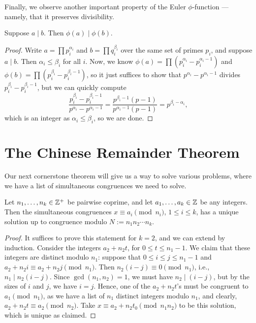 \documentclass{article}
\begin{document}
Finally, we observe another important property of the Euler $\phi$-function --- namely, that it preserves divisibility. \newpage
\begin{proposition}
Suppose $a\mid b$. Then $\phi(a)\mid \phi(b)$.
\end{proposition}
\begin{proof}
Write $a = \prod p_i^{\alpha_i}$ and $b = \prod q_i^{\beta_i}$ over the same set of primes $p_i$, and suppose $a\mid b$. Then $\alpha_i \leq \beta_i$ for all $i$. Now, we know $\phi(a) = \prod (p_i^{\alpha_i} - p_i^{\alpha_i-1})$ and $\phi(b) = \prod (p_i^{\beta_i} - p_i^{\beta_i-1})$, so it just suffices to show that $p^{\alpha_i}-p^{\alpha_i-1}$ divides $p_i^{\beta_i} - p_i^{\beta_i-1}$, but we can quickly compute
$$\frac{p_i^{\beta_i} - p_i^{\beta_i-1}}{p^{\alpha_i}-p^{\alpha_i-1}} = \frac{p^{\beta_i-1}(p-1)}{p^{\alpha_i-1}(p-1)} = p^{\beta_i - \alpha_i},$$
which is an integer as $\alpha_i\leq \beta_i$, so we are done.
\end{proof}

\section{The Chinese Remainder Theorem}
Our next cornerstone theorem will give us a way to solve various problems, where we have a list of simultaneous congruences we need to solve.

\begin{theorem}
Let $n_1, \ldots, n_k \in \mathbb Z^+$ be pairwise coprime, and let $a_1, \ldots, a_k\in\mathbb Z$ be any integers. Then the simultaneous congruences $x \equiv a_i\pmod{n_i}$, $1\leq i \leq k$, has a unique solution up to congruence modulo $N := n_1n_2\cdots n_k$.
\end{theorem}
\begin{proof}
It suffices to prove this statement for $k = 2$, and we can extend by induction. Consider the integers $a_2 + n_2t$, for $0\leq t \leq n_1-1$. We claim that these integers are distinct modulo $n_1$: suppose that $0\leq i \leq j \leq n_1-1$ and $a_2 + n_2i \equiv a_2 + n_2j \pmod{n_1}$. Then $n_2(i-j)\equiv 0\pmod{n_1}$, i.e., $n_1\mid n_2(i-j)$. Since $\gcd(n_1, n_2) = 1$, we must have $n_2 \mid (i-j)$, but by the sizes of $i$ and $j$, we have $i=j$. Hence, one of the $a_2 + n_2t$'s must be congruent to $a_1 \pmod{n_1}$, as we have a list of $n_1$ distinct integers modulo $n_1$, and clearly, $a_2+n_2t \equiv a_2\pmod{n_2}$. Take $x \equiv a_2 + n_2t_0 \pmod{n_1n_2}$ to be this solution, which is unique as claimed.
\end{proof}
\end{document}
